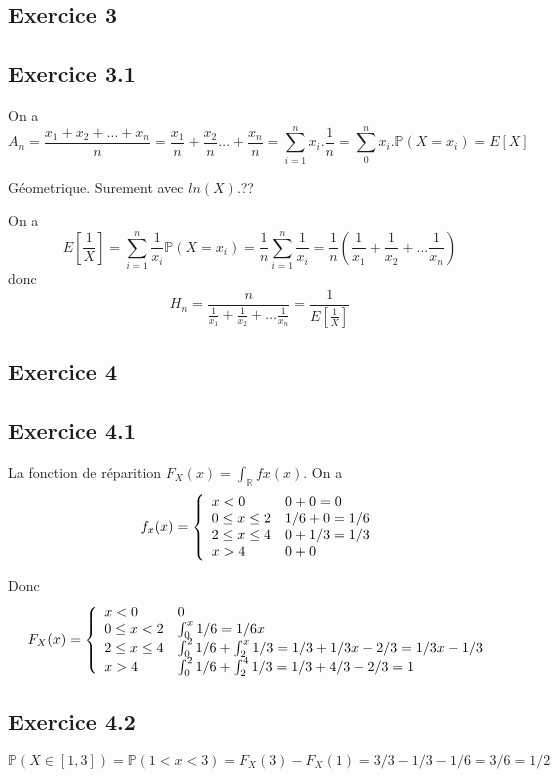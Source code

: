 \documentclass[]{book}
\theoremstyle{definition}
\newcommand{\bb}[1]{\mathbb{#1}}
\newcommand{\R}{\bb{R}}
\newcommand{\Pe}{\bb{P}}
\begin{document}
\subsection*{Exercice 3}
\subsection*{Exercice 3.1}
On a 
$$
A_n = \frac{x_1+x_2+\ldots + x_n}{n} = \frac{x_1}{n}+ \frac{x_2}{n} \ldots + \frac{x_n}{n} = \sum_{i=1}^{n}x_i.\frac{1}{n} = \sum_{0}^{n}x_i.\Pe(X=x_i) = E[X]
$$

G\'eometrique. Surement avec $ln(X)$.??

On a
$$
E[\frac{1}{X}] = \sum_{i=1}^{n}{\frac{1}{x_i}\Pe(X=x_i)} =  \frac{1}{n}\sum_{i=1}^{n}{\frac{1}{x_i}} = \frac{1}{n}(\frac{1}{x_1}+\frac{1}{x_2}+ \ldots \frac{1}{x_n})
$$
donc
$$
H_n = \frac{n}{\frac{1}{x_1}+\frac{1}{x_2}+ \ldots \frac{1}{x_n}} = \frac{1}{E[\frac{1}{X}]}
$$

\subsection*{Exercice 4}
\subsection*{Exercice 4.1}
La fonction de r\'eparition $F_X(x) = \int_{\R}fx(x)$. On a 
$$
f_x(x) =
\left\{
    \begin{array}{l l}
        x < 0 &  0 + 0 = 0 \\
        0 \leq x \leq 2 &  1/6 + 0 = 1/6 \\
        2 \leq x \leq 4 & 0 + 1/3 = 1/3 \\
        x > 4 & 0 + 0
    \end{array}
\right.
$$

Donc
$$
F_X(x) =
\left\{
    \begin{array}{l l}
        x < 0 &  0 \\
        0 \leq x < 2 & \int_{0}^{x}{1/6} = 1/6x \\
        2 \leq x \leq 4 & \int_{0}^{2}{1/6} + \int_{2}^{x}{1/3} = 1/3+1/3x-2/3 = 1/3x-1/3\\
        x > 4 & \int_{0}^{2}{1/6} + \int_{2}^{4}{1/3} = 1/3 + 4/3-2/3 = 1
    \end{array}
\right.
$$

\subsection*{Exercice 4.2}
$$
\Pe(X \in [1,3]) = \Pe(1<x<3) = F_X(3) - F_X(1) = 3/3 - 1/3 -1/6 = 3/6 = 1/2
$$
\end{document}
